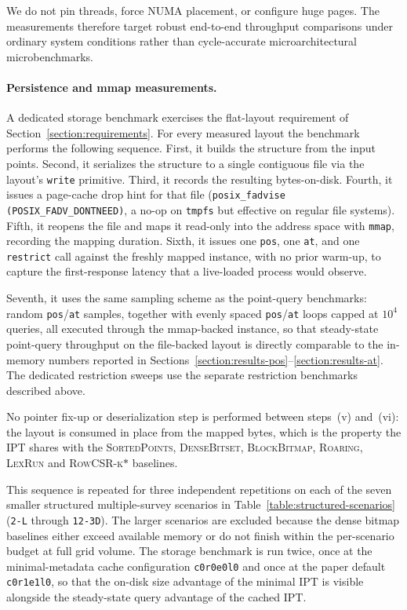 \documentclass[manuscript,screen,review]{acmart}
\theoremstyle{definition}
\theoremstyle{plain}
\begin{document}
We do not pin threads, force NUMA placement, or configure huge pages.
The measurements therefore target robust end-to-end throughput
comparisons under ordinary system conditions rather than cycle-accurate
microarchitectural microbenchmarks.

\paragraph{Persistence and mmap measurements.}
A dedicated storage benchmark exercises the flat-layout requirement of
Section~\ref{section:requirements}. For every measured layout the
benchmark performs the following sequence. First, it builds the
structure from the input points. Second, it serializes the structure
to a single contiguous file via the layout's \texttt{write}
primitive. Third, it records the resulting bytes-on-disk. Fourth, it
issues a page-cache drop hint for that file
(\texttt{posix\_fadvise (POSIX\_FADV\_DONTNEED)}, a no-op on
\texttt{tmpfs} but effective on regular file systems). Fifth, it
reopens the file and maps it read-only into the address space with
\texttt{mmap}, recording the mapping duration. Sixth, it issues one
\texttt{pos}, one \texttt{at}, and one \texttt{restrict} call against
the freshly mapped instance, with no prior warm-up, to capture the
first-response latency that a live-loaded process would observe.

Seventh, it uses the same sampling scheme as the point-query
benchmarks: random \texttt{pos}/\texttt{at} samples, together with
evenly spaced \texttt{pos}/\texttt{at} loops capped at
$10^4$ queries, all executed through the mmap-backed instance, so that
steady-state point-query throughput on the file-backed layout is
directly comparable to the in-memory numbers reported in
Sections~\ref{section:results-pos}--\ref{section:results-at}. The
dedicated restriction sweeps use the separate restriction benchmarks
described above.

No pointer fix-up or deserialization step is performed between
steps~(v) and~(vi): the layout is consumed in place from the mapped
bytes, which is the property the IPT shares with the
\textsc{SortedPoints}, \textsc{DenseBitset}, \textsc{BlockBitmap},
\textsc{Roaring}, \textsc{LexRun} and \textsc{RowCSR-k\(*\)} baselines.

This sequence is repeated for three independent repetitions on
each of the seven smaller structured multiple-survey scenarios
in Table~\ref{table:structured-scenarios} (\texttt{2-L} through
\texttt{12-3D}). The larger scenarios are
excluded because the dense bitmap baselines either exceed available
memory or do not finish within the per-scenario budget at full grid
volume. The storage benchmark is run twice, once at the
minimal-metadata cache configuration \texttt{c0r0e0l0} and once at the
paper default \texttt{c0r1e1l0}, so that the on-disk size advantage of
the minimal IPT is visible alongside the steady-state query advantage
of the cached IPT.
\end{document}
